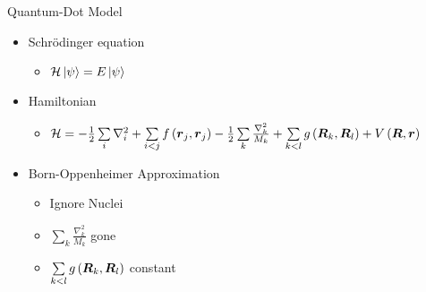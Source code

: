 \documentclass[10pt, t, xcolor=dvipsnames]{beamer}
\begin{document}
\begin{frame}[fragile]{Quantum-Dot Model}
    \begin{itemize}
        \item Schrödinger equation 
            \begin{itemize}
                \item $\mathcal{H}\ket{\psi} = E\ket{\psi}$
            \end{itemize}
        \item Hamiltonian
            \begin{itemize}
                \item $\mathcal{H} = - \frac{1}{2} \sum\limits_i \nabla^2_i +
                    \sum\limits_{i<j} f\left(\bm{{r}}_j, \bm{{r}}_j\right) -
                    \frac{1}{2} \sum\limits_k \frac{\nabla^2_k}{M_k} + \sum\limits_{k<l}
                    g\left(\bm{{R}}_k,\bm{{R}}_l\right) +
                    V\left(\bm{{R}},\bm{{r}}\right)$
            \end{itemize}
        \item Born-Oppenheimer Approximation
            \begin{itemize}
                \item Ignore Nuclei
                \item $\sum\limits_k \frac{\nabla^2_k}{M_k}$ gone
                \item $\sum\limits_{k<l} g\left(\bm{{R}}_k,\bm{{R}}_l\right)$ constant
            \end{itemize}
    \end{itemize}
\end{frame}
\end{document}
